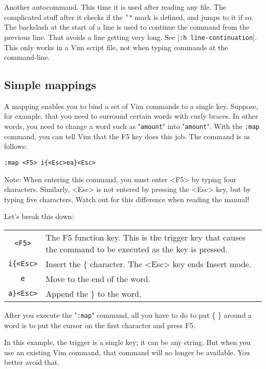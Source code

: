 Another autocommand.
This time it is used after reading any file.
The complicated stuff after it checks if the \texttt{'"} mark is defined, and jumps to it if so.
The backslash at the start of a line is used to continue the command from the previous line.
That avoids a line getting very long.
See |\texttt{:h line-continuation}|.
This only works in a Vim script file, not when typing commands at the command-line.

\subsection{Simple mappings}
\label{Simple mappings}
A mapping enables you to bind a set of Vim commands to a single key.
Suppose, for example, that you need to surround certain words with curly braces.
In other words, you need to change a word such as "\texttt{amount}" into "{\texttt{amount}}".
With the \texttt{:map} command, you can tell Vim that the F5 key does this job.
The command is as follows:

 \begin{Verbatim}[samepage=true]
 :map <F5> i{<Esc>ea}<Esc>
 \end{Verbatim}
 
Note: When entering this command, you must enter <F5> by typing four characters.
Similarly, <Esc> is not entered by pressing the <Esc> key, but by typing five characters.
Watch out for this difference when reading the manual!

Let's break this down:
\begin{longtable}{c l}
				\texttt{<F5>} & The F5 function key.
				This is the trigger key that causes the command to be executed as the key is pressed.\\

				\texttt{i\{<Esc>} & Insert the \{ character.
				The <Esc> key ends Insert mode.\\

				\texttt{e} & Move to the end of the word.\\

				\texttt{a\}<Esc>} & Append the \} to the word.\\
\end{longtable}

After you execute the "\texttt{:map}" command, all you have to do to put \{ \} around a word is to put the cursor on the first character and press F5.

In this example, the trigger is a single key; it can be any string.
But when you use an existing Vim command, that command will no longer be available.
You better avoid that.

